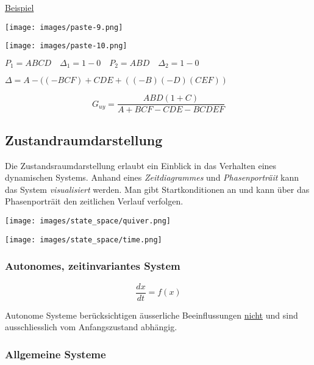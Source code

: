 \documentclass[
  10pt,
  a4paper,
  twocolumn]{article}
\numberwithin{equation}{section}
\begin{document}
\ul{Beispiel}

\texttt{[image: images/paste-9.png]}

\texttt{[image: images/paste-10.png]}

\(P_1 = ABCD \quad \Delta_1 = 1-0\quad P_2 = ABD \quad \Delta_2=1-0\)

\(\Delta=A-((-BCF)+CDE+((-B)(-D)(CEF))\)

\[
G_{uy}=\frac{ABD(1+C)}{A+BCF-CDE-BCDEF}
\]

\subsection{Zustandraumdarstellung}\label{zustandraumdarstellung}

Die Zustandsraumdarstellung erlaubt ein Einblick in das Verhalten eines
dynamischen Systems. Anhand eines \emph{Zeitdiagrammes} und
\emph{Phasenporträit} kann das System \emph{visualisiert} werden. Man
gibt Startkonditionen an und kann über das Phasenporträit den zeitlichen
Verlauf verfolgen.

\begin{center}
\texttt{[image: images/state\_space/quiver.png]}
\end{center}

\begin{center}
\texttt{[image: images/state\_space/time.png]}
\end{center}

\subsubsection{Autonomes, zeitinvariantes
System}\label{autonomes-zeitinvariantes-system}

\begin{center}
\end{center}

\[
\frac{dx}{dt}=f(x)
\]

Autonome Systeme berücksichtigen äusserliche Beeinflussungen \ul{nicht}
und sind ausschliesslich vom Anfangszustand abhängig.

\subsubsection{Allgemeine Systeme}\label{allgemeine-systeme}
\end{document}
